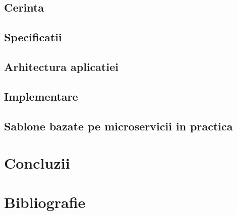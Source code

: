 \documentclass[11pt,titlepage]{article}
\begin{document}
	\subsection{Cerinta}
	\subsection{Specificatii}
	\subsection{Arhitectura aplicatiei}
	\subsection{Implementare}
	\subsection{Sablone bazate pe microservicii in practica}
\section{Concluzii}
\section{Bibliografie}
\end{document}
